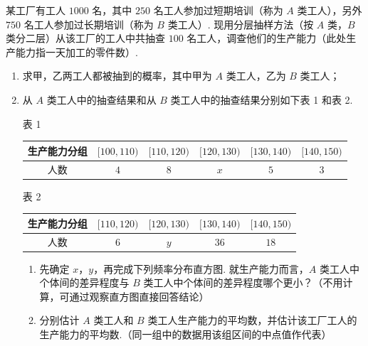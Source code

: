 \begin{problem}
某工厂有工人 \(1000\) 名，其中 \(250\) 名工人参加过短期培训（称为 \(A\) 类工人），另外 \(750\) 名工人参加过长期培训（称为 \(B\) 类工人）. 现用分层抽样方法（按 \(A\) 类，\(B\) 类分二层）从该工厂的工人中共抽查 \(100\) 名工人，调查他们的生产能力（此处生产能力指一天加工的零件数）.

\begin{enumerate}
\item 求甲，乙两工人都被抽到的概率，其中甲为 \(A\) 类工人，乙为 \(B\) 类工人；
\item 从 \(A\) 类工人中的抽查结果和从 \(B\) 类工人中的抽查结果分别如下表 1 和表 2.

\begin{center}
表 1

\begin{tabular}{c|ccccc}
\hline
生产能力分组 & \([100,110)\) & \([110,120)\) & \([120,130)\) & \([130,140)\) & \([140,150)\) \\
\hline
人数 & \(4\) & \(8\) & \(x\) & \(5\) & \(3\) \\
\hline
\end{tabular}
\end{center}

\begin{center}
表 2

\begin{tabular}{c|cccc}
\hline
生产能力分组 & \([110,120)\) & \([120,130)\) & \([130,140)\) & \([140,150)\) \\
\hline
人数 & \(6\) & \(y\) & \(36\) & \(18\) \\
\hline
\end{tabular}
\end{center}

\begin{enumerate}
\item 先确定 \(x\)，\(y\)，再完成下列频率分布直方图. 就生产能力而言，\(A\) 类工人中个体间的差异程度与 \(B\) 类工人中个体间的差异程度哪个更小？（不用计算，可通过观察直方图直接回答结论）
\item 分别估计 \(A\) 类工人和 \(B\) 类工人生产能力的平均数，并估计该工厂工人的生产能力的平均数.（同一组中的数据用该组区间的中点值作代表）
\end{enumerate}
\end{enumerate}
\end{problem}

